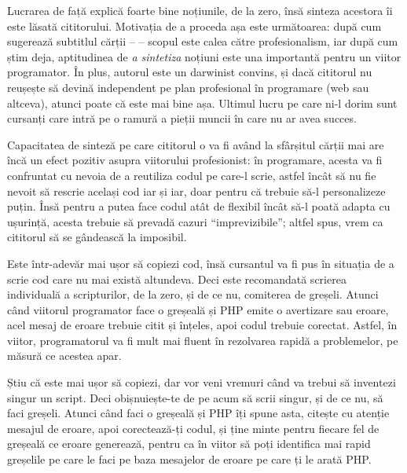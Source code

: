 Lucrarea de față explică foarte bine noțiunile, de la zero, însă sinteza
acestora îi este lăsată cititorului. Motivația de a proceda așa este
următoarea: după cum sugerează subtitlul cărții -- \textit{\thesubtitle} --
scopul este calea către profesionalism, iar după cum știm deja, aptitudinea de
\textit{a sintetiza} noțiuni este una importantă pentru un viitor programator.
În plus, autorul este un darwinist convins, și dacă cititorul nu reușește să
devină independent pe plan profesional în programare (web sau altceva), atunci
poate că este mai bine așa. Ultimul lucru pe care ni-l dorim sunt cursanți care
intră pe o ramură a pieții muncii în care nu ar avea succes.

Capacitatea de sinteză pe care cititorul o va fi având la sfârșitul cărții mai
are încă un efect pozitiv asupra viitorului profesionist: în programare, acesta
va fi confruntat cu nevoia de a reutiliza codul pe care-l scrie, astfel încât
să nu fie nevoit să rescrie același cod iar și iar, doar pentru că trebuie să-l
personalizeze puțin. Însă pentru a putea face codul atât de flexibil încât să-l
poată adapta cu ușurință, acesta trebuie să prevadă cazuri ``imprevizibile'';
altfel spus, vrem ca cititorul să se gândească la imposibil.


Este într-adevăr mai ușor să copiezi cod, însă cursantul va fi pus în situația
de a scrie cod care nu mai există altundeva. Deci este recomandată scrierea
individuală a scripturilor, de la zero, și de ce nu, comiterea de greșeli.
Atunci când viitorul programator face o greșeală și PHP emite o avertizare sau
eroare, acel mesaj de eroare trebuie citit și înțeles, apoi codul trebuie
corectat. Astfel, în viitor, programatorul va fi mult mai fluent în rezolvarea
rapidă a problemelor, pe măsură ce acestea apar.

Știu că este mai ușor să copiezi, dar vor veni vremuri când va trebui să
inventezi singur un script. Deci obișnuiește-te de pe acum să scrii singur, și
de ce nu, să faci greșeli. Atunci când faci o greșeală și PHP îți spune asta,
citește cu atenție mesajul de eroare, apoi corectează-ți codul, și ține minte
pentru fiecare fel de greșeală ce eroare generează, pentru ca în viitor să poți
identifica mai rapid greșelile pe care le faci pe baza mesajelor de eroare pe
care ți le arată PHP.


